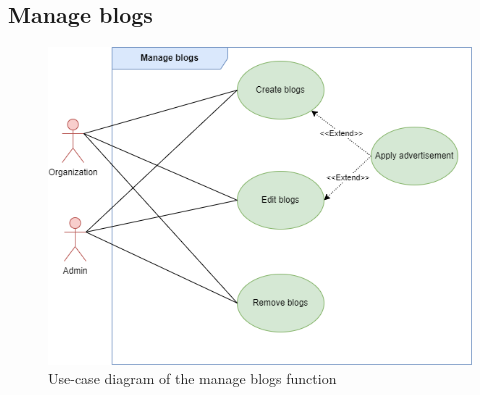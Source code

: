 

\subsection{Manage blogs}

\begin {figure}[H]
\centering
\includegraphics[width=1\textwidth]{Figures/manage_blog_ucd.png}
\caption{Use-case diagram of the manage blogs function}
\label{fig:manage-blog-activity-diagram}
\end{figure}



